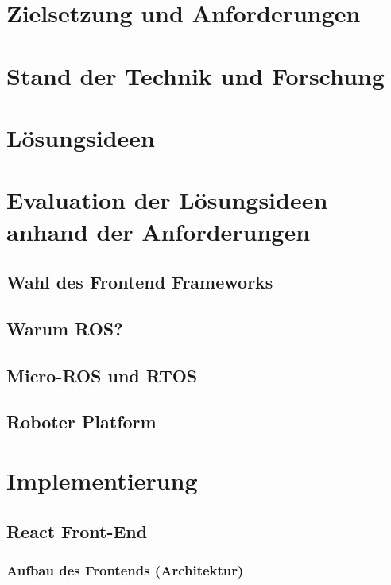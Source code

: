 \documentclass[11pt,twoside,a4paper,titlepage]{article}
\begin{document}
\section{Zielsetzung und Anforderungen}


\section{Stand der Technik und Forschung}


\section{Lösungsideen}


\section{Evaluation der Lösungsideen anhand der Anforderungen}

\subsection{Wahl des Frontend Frameworks}


\subsection{Warum ROS?}


\subsection{Micro-ROS und RTOS}


\subsection{Roboter Platform}


\section{Implementierung}

\subsection{React Front-End}
\subsubsection{Aufbau des Frontends (Architektur)}

\end{document}
